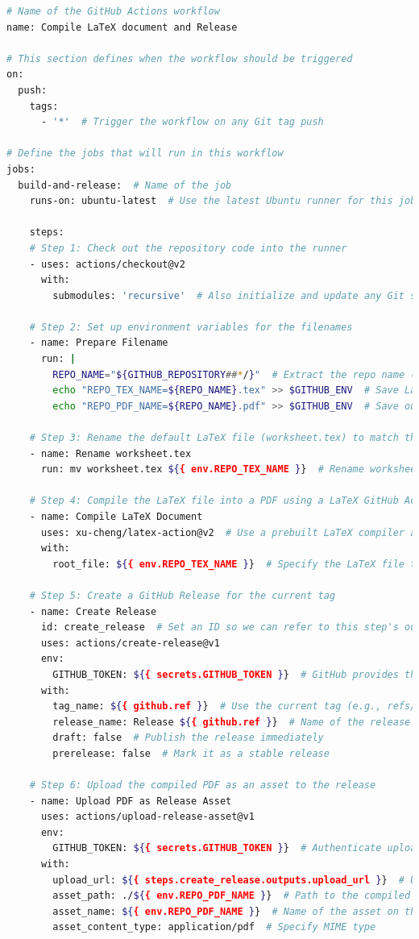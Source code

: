\documentclass{article}
\begin{document}
\begin{lstlisting}[language=bash]
# Name of the GitHub Actions workflow
name: Compile LaTeX document and Release

# This section defines when the workflow should be triggered
on:
  push:
    tags:
      - '*'  # Trigger the workflow on any Git tag push

# Define the jobs that will run in this workflow
jobs:
  build-and-release:  # Name of the job
    runs-on: ubuntu-latest  # Use the latest Ubuntu runner for this job

    steps:
    # Step 1: Check out the repository code into the runner
    - uses: actions/checkout@v2
      with:
        submodules: 'recursive'  # Also initialize and update any Git submodules

    # Step 2: Set up environment variables for the filenames
    - name: Prepare Filename
      run: |
        REPO_NAME="${GITHUB_REPOSITORY##*/}"  # Extract the repo name (e.g., "myrepo" from "user/myrepo")
        echo "REPO_TEX_NAME=${REPO_NAME}.tex" >> $GITHUB_ENV  # Save LaTeX filename as env variable
        echo "REPO_PDF_NAME=${REPO_NAME}.pdf" >> $GITHUB_ENV  # Save output PDF filename as env variable

    # Step 3: Rename the default LaTeX file (worksheet.tex) to match the repo name
    - name: Rename worksheet.tex
      run: mv worksheet.tex ${{ env.REPO_TEX_NAME }}  # Rename worksheet.tex to match the expected LaTeX filename

    # Step 4: Compile the LaTeX file into a PDF using a LaTeX GitHub Action
    - name: Compile LaTeX Document
      uses: xu-cheng/latex-action@v2  # Use a prebuilt LaTeX compiler action
      with:
        root_file: ${{ env.REPO_TEX_NAME }}  # Specify the LaTeX file to compile

    # Step 5: Create a GitHub Release for the current tag
    - name: Create Release
      id: create_release  # Set an ID so we can refer to this step's outputs later
      uses: actions/create-release@v1
      env:
        GITHUB_TOKEN: ${{ secrets.GITHUB_TOKEN }}  # GitHub provides this token to authenticate API requests
      with:
        tag_name: ${{ github.ref }}  # Use the current tag (e.g., refs/tags/v1.0)
        release_name: Release ${{ github.ref }}  # Name of the release
        draft: false  # Publish the release immediately
        prerelease: false  # Mark it as a stable release

    # Step 6: Upload the compiled PDF as an asset to the release
    - name: Upload PDF as Release Asset
      uses: actions/upload-release-asset@v1
      env:
        GITHUB_TOKEN: ${{ secrets.GITHUB_TOKEN }}  # Authenticate upload
      with:
        upload_url: ${{ steps.create_release.outputs.upload_url }}  # Use the upload URL from the previous step
        asset_path: ./${{ env.REPO_PDF_NAME }}  # Path to the compiled PDF file
        asset_name: ${{ env.REPO_PDF_NAME }}  # Name of the asset on the release page
        asset_content_type: application/pdf  # Specify MIME type
\end{lstlisting}
\end{document}
